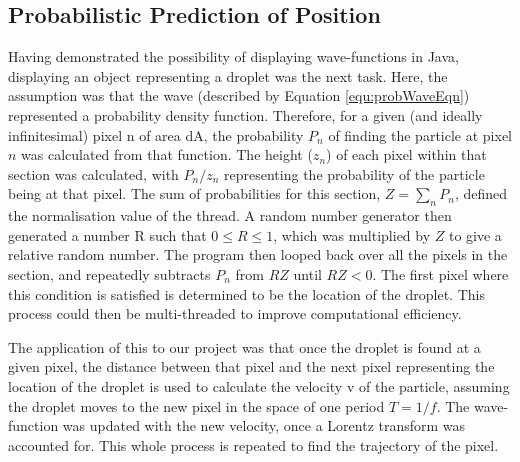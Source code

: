 \subsection{Probabilistic Prediction of Position}
Having demonstrated the possibility of displaying wave-functions in Java, displaying an object representing a droplet was the next task. Here, the assumption was that the wave (described by Equation \ref{equ:probWaveEqn}) represented a probability density function. Therefore, for a given (and ideally infinitesimal) pixel n of area dA, the probability $P_n$ of finding the particle at pixel $n$ was calculated from that function. The height ($z_n$) of each pixel within that section was calculated, with ${P_n}/{z_n}$ representing the probability of the particle being at that pixel. The sum of probabilities for this section, $Z=\sum_n{P_n}$, defined the normalisation value of the thread. A random number generator then generated a number R such that $0\leq R \leq 1$, which was multiplied by $Z$ to give a relative random number. The program then looped back over all the pixels in the section, and repeatedly subtracts $P_n$ from $RZ$ until $RZ<0$. The first pixel where this condition is satisfied is determined to be the location of the droplet. This process could then be multi-threaded to improve computational efficiency.

The application of this to our project was that once the droplet is found at a given pixel, the distance between that pixel and the next pixel representing the location of the droplet is used to calculate the velocity v of the particle, assuming the droplet moves to the new pixel in the space of one period $T=1/f$. The wave-function was updated with the new velocity, once a Lorentz transform was accounted for. This whole process is repeated to find the trajectory of the pixel.

